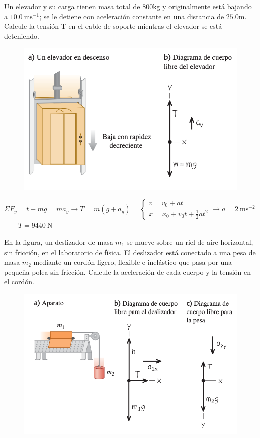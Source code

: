 \begin{prob}
\begin{multicols}{2}
Un elevador y su carga tienen masa total de $800 \mathrm{kg}$  y originalmente está bajando a $10.0 \ \mathrm{ms}^{-1}$; se le detiene con aceleración constante en una distancia de $25.0 \mathrm{m}$. Calcule la tensión T en el cable de soporte mientras el elevador se está deteniendo.	
\begin{figure}[H]
	\centering
	\includegraphics[width=.4\textwidth]{imagenes/imagenes03/T03IM39.png}
	\end{figure}
\end{multicols}
\end{prob}
$\Sigma F_y=t-mg=ma_y \to T=m(g+a_y)$
$ \quad \begin{cases} v=v_0+at \\ x=x_0+v_0 t + \frac 1 2 a t^2  \end{cases} \to a=2\ \mathrm{m s}^{-2}$ $\qquad T=9440\ \mathrm{N}$


\vspace{10mm} %
\begin{prob}
En la figura, un deslizador de masa $m_1$ se mueve sobre un riel de aire horizontal, sin fricción, en el laboratorio de física. El deslizador está conectado a una pesa de masa $m_2$ mediante un cordón ligero, flexible e inelástico que pasa por una pequeña polea sin fricción. Calcule la aceleración de cada cuerpo y la tensión en el cordón.	
\begin{figure}[H]
	\centering
	\includegraphics[width=.75\textwidth]{imagenes/imagenes03/T03IM40.png}
	\end{figure}
\end{prob}

